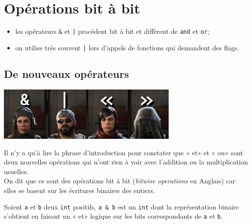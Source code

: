 \documentclass[a4paper,10pt,cours,firamath]{nsi}
\begin{document}
\chapter{Opérations bit à bit}
\begin{aretenir}
	\begin{itemize}
		\item 	les opérateurs \texttt{&} et \texttt{|} procèdent bit à bit et diffèrent de \texttt{and} et \texttt{or};
		      
		\item 	on utilise très souvent \texttt{|} lors d'appels de fonctions qui demandent des flags.
	\end{itemize}
\end{aretenir}
\section{De nouveaux opérateurs}

\begin{center}
	\includegraphics[width=9cm]{img/operateurs.png}
\end{center}
Il n'y a qu'à lire la phrase d'introduction pour constater que « et» et « ou» sont deux nouvelles opérations qui n'ont rien à voir avec l'addition ou la multiplication usuelles.\\
On dit que ce sont des opérations bit à bit (\textit{bitwise operations} en Anglais) car elles se basent sur les écritures binaires des entiers.


\begin{definition}[ : opérateur \&]
	Soient \texttt{a} et \texttt{b} deux \texttt{int} positifs, \texttt{a & b} est un \texttt{int} dont la représentation binaire s'obtient en faisant un « et» logique sur les bits correspondants de \texttt{a} et \texttt{b}.
\end{definition}
\end{document}
